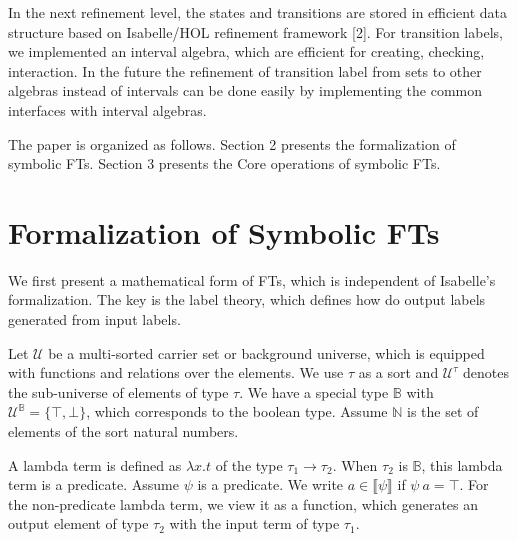 \documentclass[a4paper,UKenglish,cleveref, autoref, thm-restate]{lipics-v2021}
\begin{document}
In the next refinement level, the states and transitions are stored in efficient data structure based on Isabelle/HOL refinement framework [2].
For transition labels, we implemented an interval algebra, which are efficient for creating, checking, interaction.
%
In the future the refinement of transition label from sets to other algebras instead of intervals can be done easily by implementing the common interfaces with interval algebras.

The paper is organized as follows. 
Section 2 presents the formalization of symbolic FTs.
Section 3 presents the Core operations of symbolic FTs. 





\section{Formalization of Symbolic FTs}

We first present a mathematical form of FTs, which is independent of Isabelle's formalization. 
The key is the label theory, which defines how do output labels generated from input labels.

Let $\mathcal{U}$ be a multi-sorted carrier set or background universe, which is equipped with functions and relations over the elements. We use $\tau$ as a sort and $\mathcal{U}^\tau$ denotes the sub-universe of elements of type $\tau$. 
We have a special type $\mathbb{B}$ with $\mathcal{U}^\mathbb{B} = \{ \top, \bot\}$, which corresponds to the boolean type. Assume $\mathbb{N}$ is the set of elements of the sort natural numbers.

A lambda term is defined as $\lambda x. t$ of the type $\tau_1 \rightarrow \tau_2$.
When $\tau_2$ is $\mathbb{B}$, this lambda term is a predicate. Assume $\psi$ is a predicate. We write $a\in \llbracket\psi \rrbracket$ if $\psi~a=\top$. For the non-predicate lambda term, we view it as a function, which generates an output element of type $\tau_2$ with the input term of type $\tau_1$. 
\end{document}
